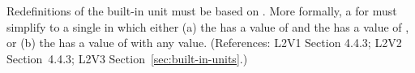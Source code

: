 Redefinitions of the built-in unit  must be based on
.  More formally, a \UnitDefinition for  must
simplify to a single \Unit in which either (a) the 
 has a value of  and the 
 has a value of , or (b) the 
 has a value of  with any
 value.  (References: L2V1 Section 4.4.3; L2V2
Section~4.4.3; L2V3 Section~\ref{sec:built-in-units}.)
